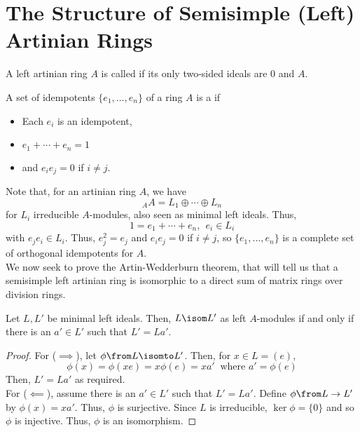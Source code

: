 \documentclass[11pt,leqno,oneside]{amsbook}
\numberwithin{thm}{section}
\begin{document}
\section{The Structure of Semisimple (Left) Artinian Rings}
\begin{defn}
  A left artinian ring \(A\) is called  if its only
  two-sided ideals
  are \(0\) and \(A\).
\end{defn}
\begin{defn}
  A set of idempotents \(\{e_1, \ldots, e_n\}\) of a ring \(A\) is a
   if
  \begin{itemize}
  \item Each \(e_i\) is an idempotent,
  \item \(e_1 + \cdots + e_n = 1\)
  \item and \(e_i e_j = 0\) if \(i \neq j\).
  \end{itemize}
\end{defn}
Note that, for an artinian ring \(A\), we have \[
  {}_A A = L_1 \oplus \cdots \oplus L_n
\]
for \(L_i\) irreducible \(A\)-modules, also seen as minimal left
ideals. Thus, \[
  1 = e_1 + \cdots + e_n, \ \ e_i \in L_i
\]
with \(e_j e_i \in L_i\). Thus, \(e_j^2 = e_j\) and \(e_i e_j = 0\) if
\(i \neq j\), so \(\{e_1, \ldots, e_n\}\) is a complete set of
orthogonal idempotents for \(A\). \\

We now seek to prove the Artin-Wedderburn theorem, that will tell us
that a semisimple left artinian ring is isomorphic to a direct sum of
matrix rings over division rings.
\begin{lem}\label{wedderburn-lem-1}
  Let \(L,L'\) be minimal left ideals. Then, \(L \isom L'\) as left
  \(A\)-modules if and only if there is an \(a' \in L'\) such that
  \(L' = La'\).
\end{lem}
\begin{proof}
  For (\(\implies\)), let \(\phi \from L \isomto L'\). Then, for \(x
  \in L = (e)\), \[
    \phi(x) = \phi(xe) = x \phi(e) = xa' \ \text{ where } a' = \phi(e)
  \]
  Then, \(L' = La'\) as required. \\

  For (\(\impliedby\)), assume there is an \(a' \in L'\) such that
  \(L' = La'\). Define \(\phi \from L \to L'\) by \(\phi(x) =
  xa'\). Thus, \(\phi\) is surjective. Since \(L\) is irreducible,
  \(\ker \phi = \{0\}\) and so \(\phi\) is injective. Thus, \(\phi\)
  is an isomorphism.
\end{proof}
\end{document}
